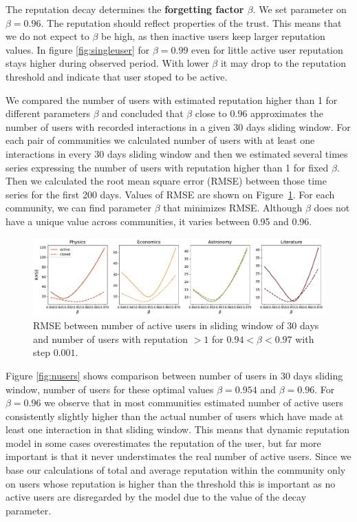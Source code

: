 The reputation decay determines the \textbf{forgetting factor $\beta$}. We set parameter on $\beta=0.96$. The reputation should reflect properties of the trust. This means that we do not expect to $\beta$ be high, as then inactive users keep larger reputation values. In figure \ref{fig:singleuser} for $\beta=0.99$ even for little active user reputation stays higher during observed period. With lower $\beta$ it may drop to the reputation threshold and indicate that user stoped to be active.  

We compared the number of users with estimated reputation higher than 1 for different parameters $\beta$ and concluded that $\beta$ close to $0.96$ approximates the number of users with recorded interactions in a given 30 days sliding window. For each pair of communities we calculated number of users with at least one interactions in every 30 days sliding window and then we estimated several times series expressing the number of users with reputation higher than 1 for fixed $\beta$. Then we calculated the root mean square error (RMSE) between those time series for the first 200 days. Values of RMSE are shown on Figure~\ref{fig:rmse}. For each community, we can find parameter $\beta$ that minimizes RMSE. Although $\beta$ does not have a unique value across communities, it varies between 0.95 and 0.96.  

\begin{figure}[h!]
	\centering
	\includegraphics[width=\linewidth]{figures/stackexchange/rmse.pdf}
	\caption{RMSE between number of active users in sliding window of 30 days and number of users with reputation $>1$ for  $0.94< \beta <0.97$ with step $0.001$. }
	\label{fig:rmse}
\end{figure}

Figure \ref{fig:nusers} shows comparison between number of users in 30 days sliding window, number of users for these optimal values $\beta = 0.954$ and $\beta =0.96$. For $\beta = 0.96$ we observe that in most communities estimated number of active users consistently slightly higher than the actual number of users which have made at least one interaction in that sliding window. This means that dynamic reputation model in some cases overestimates the reputation of the user, but far more important is that it never understimates the real number of active users. Since we base our calculations of total and average reputation within the community only on users whose reputation is higher than the threshold this is important as no active users are disregarded by the model due to the value of the decay parameter.

